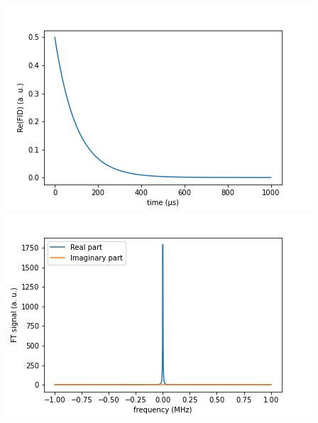 \documentclass[10pt]{beamer}
\begin{document}
\begin{frame}
$$\begin{columns}[T]
\begin{column}{.5\textwidth}
\begin{column}{.5\textwidth}
\end{column}
\end{column}
\begin{column}{.5\textwidth}
\includegraphics[width=\textwidth]{./spin1-2/33correlated_pure_hyperfine/FIDSignal.png}
\includegraphics[width=\textwidth]{./spin1-2/33correlated_pure_hyperfine/FTSignal.png}
\end{column}
\end{columns}
\end{frame}
\end{document}
